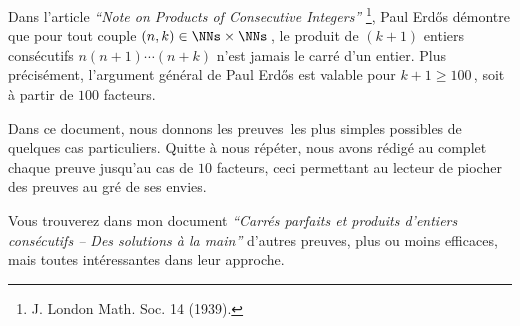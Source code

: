 Dans l'article \emph{\enquote{Note on Products of Consecutive Integers}}
\footnote{
	J. London Math. Soc. 14 (1939).
},
Paul Erdős démontre que pour tout couple $(n, k) \in \NNs \times \NNs$\,, le produit de $(k+1)$ entiers consécutifs $n (n + 1) \cdots (n + k)$ n'est jamais le carré d'un entier. 
Plus précisément, l'argument général de Paul Erdős est valable pour $k + 1 \geq 100$\,, soit à partir de $100$ facteurs.

\medskip

Dans ce document, nous donnons les preuves les plus simples possibles de quelques cas particuliers. Quitte à nous répéter, nous avons rédigé au complet chaque preuve jusqu'au cas de $10$ facteurs, ceci permettant au lecteur de piocher des preuves au gré de ses envies.


\begin{remark}
	Vous trouverez dans mon document \emph{\enquote{Carrés parfaits et produits d'entiers consécutifs -- Des solutions à la main}} d'autres preuves, plus ou moins efficaces, mais toutes intéressantes dans leur approche.
\end{remark}

